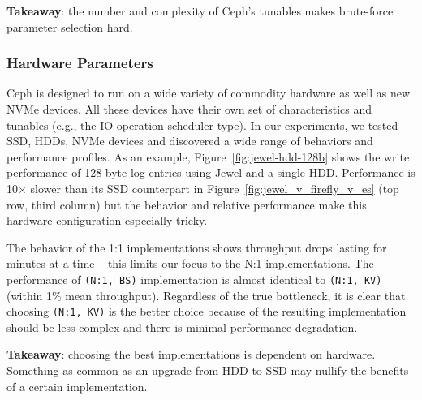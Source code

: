 \textbf{Takeaway}: the number and complexity of Ceph's tunables makes
brute-force parameter selection hard.

\subsubsection{Hardware Parameters}

Ceph is designed to run on a wide variety of commodity hardware as well as new
NVMe devices. All these devices have their own set of characteristics and
tunables (e.g., the IO operation scheduler type). In our experiments, we tested
SSD, HDDs, NVMe devices and discovered a wide range of behaviors and
performance profiles. As an example, Figure~\ref{fig:jewel-hdd-128b} shows the
write performance of 128 byte log entries using Jewel and a single HDD.
Performance is 10\(\times\) slower than its SSD counterpart in
Figure~\ref{fig:jewel_v_firefly_v_es} (top row, third column) but the behavior
and relative performance make this hardware configuration especially tricky.

The behavior of the 1:1 implementations shows throughput drops lasting for
minutes at a time -- this limits our focus to the N:1 implementations. The
performance of \texttt{(N:1, BS)} implementation is almost identical to
\texttt{(N:1, KV)} (within 1\% mean throughput). Regardless of the true
bottleneck, it is clear that choosing \texttt{(N:1, KV)} is the better choice
because of the resulting implementation should be less complex and there is
minimal performance degradation.

\textbf{Takeaway}: choosing the best implementations is dependent on hardware.
Something as common as an upgrade from HDD to SSD may nullify the benefits of a
certain implementation. 
